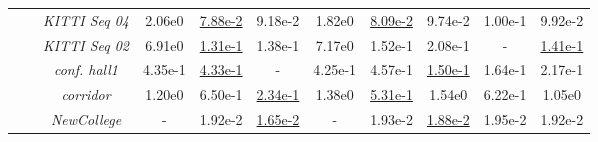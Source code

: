 \begin{table*}[t]
\begin{tabular}{c|c||c|c|c||c|c|c|c|c}
		\midrule
		\  \parbox[t]{1mm}{}\ 
				
		& \textit{KITTI Seq 04} 	& 2.06e0 	& \underline{7.88e-2} 	& 9.18e-2  & \textcolor{f0}{1.82e0} & \underline{\textcolor{f0}{8.09e-2}}&\textcolor{f0}{9.74e-2} & \textcolor{f0}{1.00e-1} &  \textcolor{f0}{9.92e-2} \\ 
		
		& \textit{KITTI Seq 02}		& 6.91e0		& \underline{1.31e-1}		& 1.38e-1	 & \textcolor{f0}{7.17e0} & \textcolor{f0}{1.52e-1}& \textcolor{f2}{2.08e-1} & - &  \underline{\textcolor{f3}{1.41e-1}}\\	
		
		& \textit{conf. hall1} 		& 4.35e-1  & \underline{4.33e-1}	& -	 & \textcolor{f0}{4.25e-1}& \textcolor{f0}{4.57e-1}& \underline{\textcolor{f4}{1.50e-1}}& \textcolor{f0}{1.64e-1}& \textcolor{f1}{2.17e-1}\\%
		
		& \textit{corridor}			& 1.20e0	&	6.50e-1		&	\underline{2.34e-1}	 & \textcolor{f0}{1.38e0}& \underline{\textcolor{f0}{5.31e-1}}& \textcolor{f4}{1.54e0}& \textcolor{f0}{6.22e-1}& \textcolor{f1}{1.05e0}\\
		
		& \textit{NewCollege}  		& -        & 1.92e-2   & \underline{1.65e-2}  & - & \textcolor{f0}{1.93e-2} & \underline{\textcolor{f1}{1.88e-2}}& \textcolor{f0}{1.95e-2}&  \textcolor{f0}{1.92e-2}\\ 	
		\midrule[0.1pt]
 	\bottomrule	[1pt]
	\end{tabular} 
	\label{tab:accuracy_summary}
\end{table*}